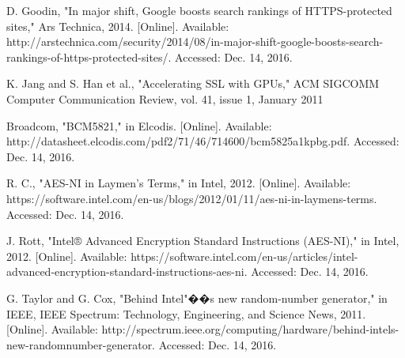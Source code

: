 \documentclass[journal]{IEEEtran}
\begin{document}
\begin{thebibliography}{1}
D. Goodin, "In major shift, Google boosts search rankings of HTTPS-protected sites," Ars Technica, 2014. [Online]. Available: http://arstechnica.com/security/2014/08/in-major-shift-google-boosts-search-rankings-of-https-protected-sites/. Accessed: Dec. 14, 2016.

K. Jang and S. Han et al., "Accelerating SSL with GPUs," ACM
SIGCOMM Computer Communication Review, vol. 41, issue 1,
January 2011

Broadcom, "BCM5821," in Elcodis. [Online]. Available: http://datasheet.elcodis.com/pdf2/71/46/714600/bcm5825a1kpbg.pdf. Accessed: Dec. 14, 2016.

R. C., "AES-NI in Laymen's Terms," in Intel, 2012. [Online]. Available: https://software.intel.com/en-us/blogs/2012/01/11/aes-ni-in-laymens-terms. Accessed: Dec. 14, 2016.

J. Rott, "Intel® Advanced Encryption Standard Instructions (AES-NI)," in Intel, 2012. [Online]. Available: https://software.intel.com/en-us/articles/intel-advanced-encryption-standard-instructions-aes-ni. Accessed: Dec. 14, 2016.

G. Taylor and G. Cox, "Behind Intel"��s new random-number generator," in IEEE, IEEE Spectrum: Technology, Engineering, and Science News, 2011. [Online]. Available: http://spectrum.ieee.org/computing/hardware/behind-intels-new-randomnumber-generator. Accessed: Dec. 14, 2016.

\end{thebibliography}


\end{document}
